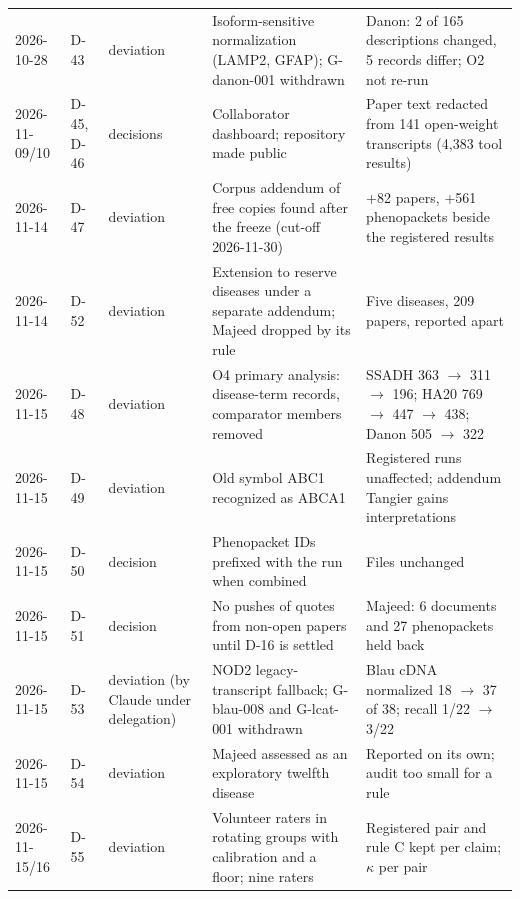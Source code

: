 \documentclass{article} %
\begin{document}
\begin{table}[h]
\begin{center}
\begin{tabular}{p{1.5cm}p{0.7cm}p{1.4cm}p{4.1cm}p{3.8cm}}
2026-10-28 & D-43 & deviation & Isoform-sensitive normalization (LAMP2, GFAP); G-danon-001 withdrawn & Danon: 2 of 165 descriptions changed, 5 records differ; O2 not re-run \\
2026-11-09/10 & D-45, D-46 & decisions & Collaborator dashboard; repository made public & Paper text redacted from 141 open-weight transcripts (4,383 tool results) \\
2026-11-14 & D-47 & deviation & Corpus addendum of free copies found after the freeze (cut-off 2026-11-30) & +82 papers, +561 phenopackets beside the registered results \\
2026-11-14 & D-52 & deviation & Extension to reserve diseases under a separate addendum; Majeed dropped by its rule & Five diseases, 209 papers, reported apart \\
2026-11-15 & D-48 & deviation & O4 primary analysis: disease-term records, comparator members removed & SSADH 363 $\rightarrow$ 311 $\rightarrow$ 196; HA20 769 $\rightarrow$ 447 $\rightarrow$ 438; Danon 505 $\rightarrow$ 322 \\
2026-11-15 & D-49 & deviation & Old symbol ABC1 recognized as ABCA1 & Registered runs unaffected; addendum Tangier gains interpretations \\
2026-11-15 & D-50 & decision & Phenopacket IDs prefixed with the run when combined & Files unchanged \\
2026-11-15 & D-51 & decision & No pushes of quotes from non-open papers until D-16 is settled & Majeed: 6 documents and 27 phenopackets held back \\
2026-11-15 & D-53 & deviation (by Claude under delegation) & NOD2 legacy-transcript fallback; G-blau-008 and G-lcat-001 withdrawn & Blau cDNA normalized 18 $\rightarrow$ 37 of 38; recall 1/22 $\rightarrow$ 3/22 \\
2026-11-15 & D-54 & deviation & Majeed assessed as an exploratory twelfth disease & Reported on its own; audit too small for a rule \\
2026-11-15/16 & D-55 & deviation & Volunteer raters in rotating groups with calibration and a floor; nine raters & Registered pair and rule C kept per claim; $\kappa$ per pair \\
\bottomrule
\end{tabular}
\end{center}
\end{table}
\end{document}
